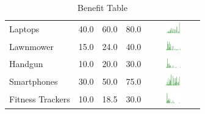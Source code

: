 \begin{table}[t]
\begin{center}
\begin{tabular}{| p{2cm} | p{1cm} | p{1cm} | p{1cm} | c |}
Laptops  & 40.0 & 60.0 & 80.0 & \includegraphics[width = 2cm, height = 0.5cm]{tables/laptopsben} \\ 
Lawnmower & 15.0 & 24.0 & 40.0 & \includegraphics[width = 2cm, height = 0.5cm]{tables/LawnmowerBenefit} \\ 
Handgun & 10.0 & 20.0 & 30.0 & \includegraphics[width = 2cm, height = 0.5cm]{tables/HandgunBenefit} \\ 
Smartphones  & 30.0 & 50.0 & 75.0 & \includegraphics[width = 2cm, height = 0.5cm]{tables/smartphonesben} \\ 
Fitness Trackers  & 10.0 & 18.5 & 30.0 & \includegraphics[width = 2cm, height = 0.5cm]{tables/fitnesstrackersben} \\ 
\hline
\end{tabular}
\caption{Benefit Table}
\label{top10}
\end{center}
\end{table}
